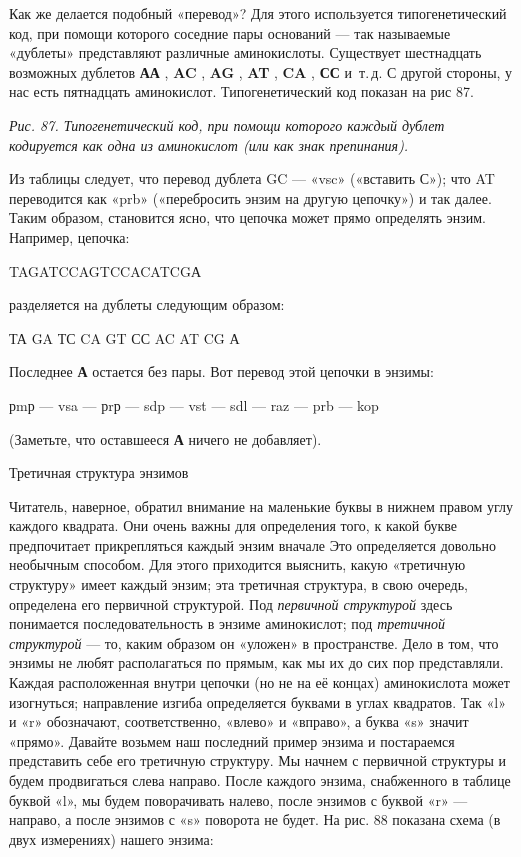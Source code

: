 \documentclass[../main.tex]{subfiles}
\begin{document}
Как же делается подобный «перевод»? Для этого используется типогенетический код, при помощи которого соседние пары оснований --- так называемые «дублеты» представляют различные аминокислоты. Существует шестнадцать возможных дублетов \textbf{АА} , \textbf{AC} , \textbf{AG} , \textbf{AT} , \textbf{CA} , \textbf{СС} и~т.\,д. С другой стороны, у нас есть пятнадцать аминокислот. Типогенетический код показан на рис 87.

\emph{Рис. 87. Типогенетический код, при помощи которого каждый дублет кодируется как одна из аминокислот (или как знак препинания).}

Из таблицы следует, что перевод дублета GC --- «vsc» («вставить С»); что AT переводится как «prb» («перебросить энзим на другую цепочку») и так далее. Таким образом, становится ясно, что цепочка может прямо определять энзим. Например, цепочка:

TAGATCCAGTCCACATCGА

разделяется на дублеты следующим образом:

ТА GA ТС CA GT СС AC AT CG А

Последнее \textbf{А} остается без пары. Вот перевод этой цепочки в энзимы:

рmр --- vsa --- рrр --- sdp --- vst --- sdl --- raz --- prb --- kop

(Заметьте, что оставшееся \textbf{А} ничего не добавляет).

Третичная структура энзимов

Читатель, наверное, обратил внимание на маленькие буквы в нижнем правом углу каждого квадрата. Они очень важны для определения того, к какой букве предпочитает прикрепляться каждый энзим вначале Это определяется довольно необычным способом. Для этого приходится выяснить, какую «третичную структуру» имеет каждый энзим; эта третичная структура, в свою очередь, определена его первичной структурой. Под \emph{первичной структурой} здесь понимается последовательность в энзиме аминокислот; под \emph{третичной структурой} --- то, каким образом он «уложен» в пространстве. Дело в том, что энзимы не любят располагаться по прямым, как мы их до сих пор представляли. Каждая расположенная внутри цепочки (но не на её концах) аминокислота может изогнуться; направление изгиба определяется буквами в углах квадратов. Так «l» и «r» обозначают, соответственно, «влево» и «вправо», а буква «s» значит «прямо». Давайте возьмем наш последний пример энзима и постараемся представить себе его третичную структуру. Мы начнем с первичной структуры и будем продвигаться слева направо. После каждого энзима, снабженного в таблице буквой «l», мы будем поворачивать налево, после энзимов с буквой «r» --- направо, а после энзимов с «s» поворота не будет. На рис. 88 показана схема (в двух измерениях) нашего энзима:
\end{document}

